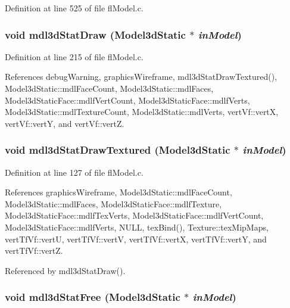 Definition at line 525 of file fl\-Model.c.
\subsubsection{\setlength{\rightskip}{0pt plus 5cm}void mdl3d\-Stat\-Draw ({\bf Model3d\-Static} $\ast$ {\em in\-Model})}\label{flModel_8c_0438033ad631c43e2df1592edfa1e101}




Definition at line 215 of file fl\-Model.c.

References debug\-Warning, graphics\-Wireframe, mdl3d\-Stat\-Draw\-Textured(), Model3d\-Static::mdl\-Face\-Count, Model3d\-Static::mdl\-Faces, Model3d\-Static\-Face::mdlf\-Vert\-Count, Model3d\-Static\-Face::mdlf\-Verts, Model3d\-Static::mdl\-Texture\-Count, Model3d\-Static::mdl\-Verts, vert\-Vf::vert\-X, vert\-Vf::vert\-Y, and vert\-Vf::vert\-Z.
\subsubsection{\setlength{\rightskip}{0pt plus 5cm}void mdl3d\-Stat\-Draw\-Textured ({\bf Model3d\-Static} $\ast$ {\em in\-Model})}\label{flModel_8c_700bf88748ec3639e8431b0b7fbd184a}




Definition at line 127 of file fl\-Model.c.

References graphics\-Wireframe, Model3d\-Static::mdl\-Face\-Count, Model3d\-Static::mdl\-Faces, Model3d\-Static\-Face::mdlf\-Texture, Model3d\-Static\-Face::mdlf\-Tex\-Verts, Model3d\-Static\-Face::mdlf\-Vert\-Count, Model3d\-Static\-Face::mdlf\-Verts, NULL, tex\-Bind(), Texture::tex\-Mip\-Maps, vert\-Tf\-Vf::vert\-U, vert\-Tf\-Vf::vert\-V, vert\-Tf\-Vf::vert\-X, vert\-Tf\-Vf::vert\-Y, and vert\-Tf\-Vf::vert\-Z.

Referenced by mdl3d\-Stat\-Draw().
\subsubsection{\setlength{\rightskip}{0pt plus 5cm}void mdl3d\-Stat\-Free ({\bf Model3d\-Static} $\ast$ {\em in\-Model})}\label{flModel_8c_14a01a131005745a25373e338494dc6e}




